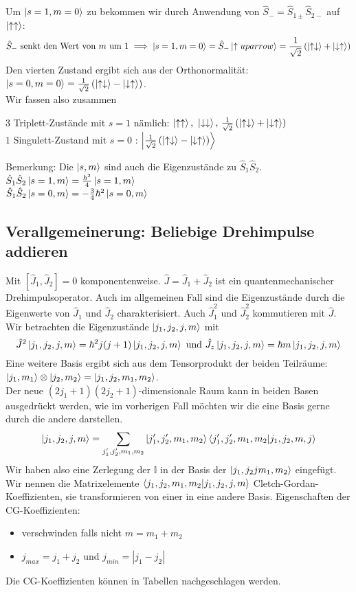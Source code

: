 \documentclass{report}
\begin{document}
Um $\ket{s = 1, m=0} $ zu bekommen wir durch Anwendung von $\hat{S}_- = \hat{S}_{1\pm}\hat{S}_{2-}$ auf $\ket{\uparrow \uparrow} $: \[
	\hat{S}_- \text{ senkt den Wert von } m \text{ um } 1 \implies \ket{s = 1, m=0} = \hat{S}_- \ket{\uparrow uparrow} = \frac{1}{\sqrt{2} } \left( \ket{\uparrow \downarrow} + \ket{\downarrow \uparrow}  \right) 
\] Den vierten Zustand ergibt sich aus der  Orthonormalität: $\ket{s = 0, m = 0} = \frac{1}{\sqrt{2} }\left( \ket{\uparrow \downarrow} - \ket{\downarrow \uparrow}  \right)  $. \\
Wir fassen also zusammen
\begin{redbox}{}
	$3$ Triplett-Zustände mit $s = 1$ nämlich: $\ket{\uparrow \uparrow} \text{, } \ket{\downarrow \downarrow} \text{, } \frac{1}{\sqrt{2} }\left( \ket{\uparrow \downarrow} + \ket{\downarrow \uparrow}  \right) $ \\
	$1$ Singulett-Zustand mit $s = 0$ : $\ket{\frac{1}{\sqrt{2} } \left( \ket{\uparrow \downarrow} - \ket{\downarrow \uparrow}  \right) } $
\end{redbox}
Bemerkung: Die $\ket{s,m} $ sind auch die Eigenzustände zu $\hat{S}_1 \hat{S}_2$. \\
$\hat{S}_1\hat{S}_2 \ket{s=1,m} = \frac{\hbar^2}{4} \ket{s=1, m} $ \\
$\hat{S}_1\hat{S}_2 \ket{s=0,m} = -\frac{3}{4} \hbar^2 \ket{s=0,m} $ 
\subsection{Verallgemeinerung: Beliebige Drehimpulse addieren}
Mit $[\hat{J}_1, \hat{J}_2] = 0$ komponentenweise. $\hat{J} = \hat{J}_1 + \hat{J}_2$ ist ein quantenmechanischer Drehimpulsoperator. Auch im allgemeinen Fall sind die Eigenzustände durch die Eigenwerte von $\hat{J}_1$ und $\hat{J}_2$ charakterisiert. Auch $\hat{J}_1^2$ und $\hat{J}_2^2$ kommutieren mit $\hat{J}$. \\

Wir betrachten die Eigenzustände $\ket{j_1,j_2,j,m} $ mit \[
	\hat{J}^2 \ket{j_1,j_2,j,m} = \hbar^2 j(j+1)\ket{j_1,j_2,j,m} \text{ und } \hat{J}_z \ket{j_1,j_2,j,m} = \hbar m \ket{j_1,j_2,j,m} 
\] Eine weitere Basis ergibt sich aus dem Tensorprodukt der beiden Teilräume: $\ket{j_1,m_1} \otimes \ket{j_2,m_2} = \ket{j_1,j_2,m_1,m_2} $. \\
Der neue $(2j_1+1)(2j_2+1)$-dimensionale Raum kann in beiden Basen ausgedrückt werden, wie im vorherigen Fall möchten wir die eine Basis gerne durch die andere darstellen.\[
	\ket{j_1,j_2,j,m} = \sum_{j_1',j_2',m_1,m_2} \ket{j_1', j_2', m_1,m_2} \bra{j_1',j_2',m_1,m_2} \ket{j_1,j_2,m,j} 
\] Wir haben also eine Zerlegung der $\mathbb{I}$ in der Basis der $\ket{j_1,j_2jm_1,m_2} $ eingefügt. Wir nennen die Matrixelemente $\bra{j_1,j_2,m_1,m_2}\ket{j_1,j_2,j,m}  $ Cletch-Gordan-Koeffizienten, sie transformieren von einer in eine andere Basis. 
Eigenschaften der CG-Koeffizienten: 
\begin{itemize}
	\item verschwinden falls nicht $m = m_1 + m_2$ 
	\item $j_{max} = j_1 + j_2$ und $j_{min} = |j_1 - j_2|$
\end{itemize}
Die CG-Koeffizienten können in Tabellen nachgeschlagen werden.
\end{document}
